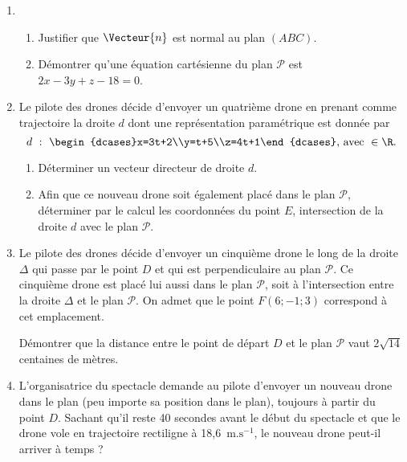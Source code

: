 \begin{enumerate}[resume]
	\item 
	\begin{enumerate}
		\item Justifier que $\Vecteur{n}$ est normal au plan $(ABC)$.
		\item Démontrer qu'une équation cartésienne du plan $\mathcal{P}$ est $2x-3y+z-18=0$.
	\end{enumerate}
	\item Le pilote des drones décide d'envoyer un quatrième drone en prenant comme trajectoire la droite $d$ dont une représentation paramétrique est donnée par \[ d~:~\begin{dcases}x=3t+2\\y=t+5\\z=4t+1\end{dcases}\text{, avec } \in \R. \]
	\begin{enumerate}
		\item Déterminer un vecteur directeur de droite $d$.
		\item Afin que ce nouveau drone soit également placé dans le plan $\mathcal{P}$, déterminer par le calcul les coordonnées du point $E$, intersection de la droite $d$ avec le plan $\mathcal{P}$.
	\end{enumerate}
	\item Le pilote des drones décide d'envoyer un cinquième drone le long de la droite $\Delta$ qui passe par le point $D$ et qui est perpendiculaire au plan $\mathcal{P}$. Ce cinquième drone est placé lui aussi dans le plan $\mathcal{P}$, soit à l'intersection entre la droite $\Delta$ et le plan $\mathcal{P}$. On admet que le point $F(6;-1;3)$ correspond à cet emplacement.
	
	Démontrer que la distance entre le point de départ $D$ et le plan $\mathcal{P}$ vaut $2\sqrt{14}$ centaines de mètres.
	\item L'organisatrice du spectacle demande au pilote d'envoyer un nouveau drone dans le plan (peu importe sa position dans le plan), toujours à partir du point $D$. Sachant qu'il reste 40 secondes avant le début du spectacle et que le drone vole en trajectoire rectiligne à 18,6~$\text{m.s}^{-1}$, le nouveau drone peut-il arriver à temps ?
\end{enumerate}